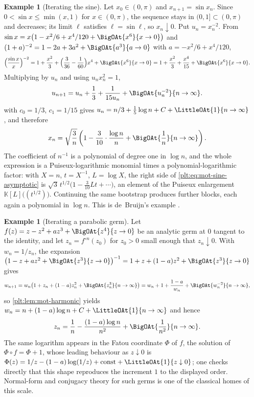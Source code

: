 \documentclass[11pt,oneside]{article}
\theoremstyle{plain}
\theoremstyle{definition}
\newtheorem{example}[theorem]{Example}
\theoremstyle{remark}
\newcommand{\K}{\mathbb{K}}
\begin{document}
\begin{example}[Iterating the sine]
\label{plt:ex:mot-sine}
Let \(x_{0}\in(0,\pi)\) and \(x_{n+1}=\sin x_{n}\).  Since
\(0<\sin x\le\min(x,1)\) for \(x\in(0,\pi)\), the sequence stays in
\((0,1]\subset(0,\pi)\) and decreases; its limit \(\ell\) satisfies
\(\ell=\sin\ell\), so \(x_{n}\downarrow0\).  Put \(u_{n}=x_{n}^{-2}\).  From
\(\sin x=x\bigl(1-x^{2}/6+x^{4}/120+\BigOAt{x^{6}}{x\to0}\bigr)\) and
\((1+a)^{-2}=1-2a+3a^{2}+\BigOAt{a^{3}}{a\to0}\) with
\(a=-x^{2}/6+x^{4}/120\),
\[
  \Bigl(\frac{\sin x}{x}\Bigr)^{-2}
  =1+\frac{x^{2}}{3}+\Bigl(\frac{3}{36}-\frac{1}{60}\Bigr)x^{4}
   +\BigOAt{x^{6}}{x\to0}
  =1+\frac{x^{2}}{3}+\frac{x^{4}}{15}+\BigOAt{x^{6}}{x\to0}.
\]
Multiplying by \(u_{n}\) and using \(u_{n}x_{n}^{2}=1\),
\[
  u_{n+1}=u_{n}+\frac13+\frac{1}{15u_{n}}
   +\BigOAt{u_{n}^{-2}}{n\to\infty}.
\]
 with \(c_{0}=1/3\), \(c_{1}=1/15\) gives
\(u_{n}=n/3+\tfrac15\log n+C+\LittleOAt{1}{n\to\infty}\), and therefore
\begin{equation}\label{plt:eq:mot-sine-asymptotic}
  x_{n}=\sqrt{\frac{3}{n}}
   \left(1-\frac{3}{10}\cdot\frac{\log n}{n}
    +\BigOAt{\frac1n}{n\to\infty}\right).
\end{equation}
The coefficient of \(n^{-1}\) is a polynomial of degree one in \(\log n\), and
the whole expression is a Puiseux-logarithmic monomial times a
polynomial-logarithmic factor: with \(X=n\), \(t=X^{-1}\), \(L=\log X\), the
right side of \eqref{plt:eq:mot-sine-asymptotic} is
\(\sqrt3\,t^{1/2}\bigl(1-\tfrac{3}{10}Lt+\cdots\bigr)\), an element of the
Puiseux enlargement \(\K[L]\bigl((t^{1/2})\bigr)\).  Continuing the same
bootstrap produces further blocks, each again a polynomial in \(\log n\).  This
is de~Bruijn's example \cite[Ch.~8]{debruijn}.
\end{example}

\begin{example}[Iterating a parabolic germ]
\label{plt:ex:mot-parabolic}
Let \(f(z)=z-z^{2}+az^{3}+\BigOAt{z^{4}}{z\to0}\) be an analytic germ at \(0\)
tangent to the identity, and let \(z_{n}=f^{\circ n}(z_{0})\) for \(z_{0}>0\)
small enough that \(z_{n}\downarrow0\).  With \(w_{n}=1/z_{n}\), the expansion
\(\bigl(1-z+az^{2}+\BigOAt{z^{3}}{z\to0}\bigr)^{-1}
 =1+z+(1-a)z^{2}+\BigOAt{z^{3}}{z\to0}\) gives
\[
  w_{n+1}=w_{n}\bigl(1+z_{n}+(1-a)z_{n}^{2}+\BigOAt{z_{n}^{3}}{n\to\infty}\bigr)
   =w_{n}+1+\frac{1-a}{w_{n}}+\BigOAt{w_{n}^{-2}}{n\to\infty},
\]
so \cref{plt:lem:mot-harmonic} yields
\(w_{n}=n+(1-a)\log n+C+\LittleOAt{1}{n\to\infty}\) and hence
\[
  z_{n}=\frac1n-\frac{(1-a)\log n}{n^{2}}
   +\BigOAt{\frac{1}{n^{2}}}{n\to\infty}.
\]
The same logarithm appears in the Fatou coordinate \(\Phi\) of \(f\), the
solution of \(\Phi\circ f=\Phi+1\), whose leading behaviour as \(z\downarrow0\)
is \(\Phi(z)=1/z-(1-a)\log(1/z)+\text{const}+\LittleOAt{1}{z\downarrow0}\);
one checks directly that this shape reproduces the increment \(1\) to the
displayed order.  Normal-form and conjugacy theory for such germs is one of the
classical homes of this scale.
\end{example}
\end{document}
